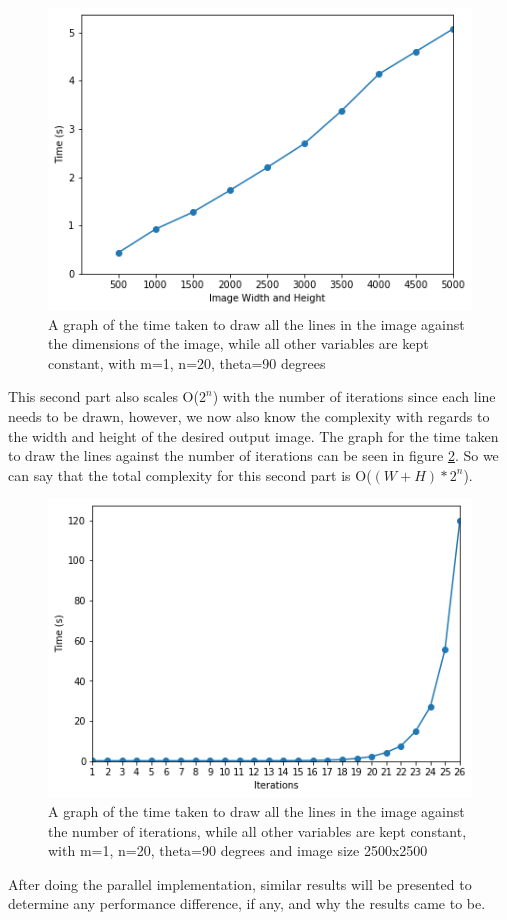 \begin{figure}
	\includegraphics[width=\linewidth]{Images/dimVStime.png}
	\centering
	\caption{A graph of the time taken to draw all the lines in the image against the dimensions of the image, while all other variables are kept constant, with m=1, n=20, theta=90 degrees}
	\label{fig:dimVStime}
\end{figure}

This second part also scales O($2^n$) with the number of iterations since each line needs to be drawn, however, we now also know the complexity with regards to the width and height of the desired output image. The graph for the time taken to draw the lines against the number of iterations can be seen in figure \ref{fig:iterVStimeImage}. So we can say that the total complexity for this second part is O($(W+H)*2^n$).

\begin{figure}
	\includegraphics[width=\linewidth]{Images/iterVStimeImage.png}
	\centering
	\caption{A graph of the time taken to draw all the lines in the image against the number of iterations, while all other variables are kept constant, with m=1, n=20, theta=90 degrees and image size 2500x2500}
	\label{fig:iterVStimeImage}
\end{figure}

After doing the parallel implementation, similar results will be presented to determine any performance difference, if any, and why the results came to be.